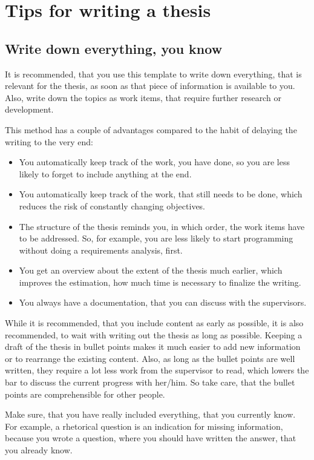 \chapter{Tips for writing a thesis}

\section{Write down everything, you know}
It is recommended, that you use this template to write down everything, that is relevant for the thesis, as soon as that piece of information is available to you.
Also, write down the topics as work items, that require further research or development.

This method has a couple of advantages compared to the habit of delaying the writing to the very end:
\begin{itemize}
	\item You automatically keep track of the work, you have done, so you are less likely to forget to include anything at the end.
	\item You automatically keep track of the work, that still needs to be done, which reduces the risk of constantly changing objectives.
	\item The structure of the thesis reminds you, in which order, the work items have to be addressed.
	      So, for example, you are less likely to start programming without doing a requirements analysis, first.
	\item You get an overview about the extent of the thesis much earlier, which improves the estimation, how much time is necessary to finalize the writing.
	\item You always have a documentation, that you can discuss with the supervisors.
\end{itemize}

While it is recommended, that you include content as early as possible, it is also recommended, to wait with writing out the thesis as long as possible.
Keeping a draft of the thesis in bullet points makes it much easier to add new information or to rearrange the existing content.
Also, as long as the bullet points are well written, they require a lot less work from the supervisor to read, which lowers the bar to discuss the current progress with her/him.
So take care, that the bullet points are comprehensible for other people.

Make sure, that you have really included everything, that you currently know.
For example, a rhetorical question is an indication for missing information, because you wrote a question, where you should have written the answer, that you already know.

